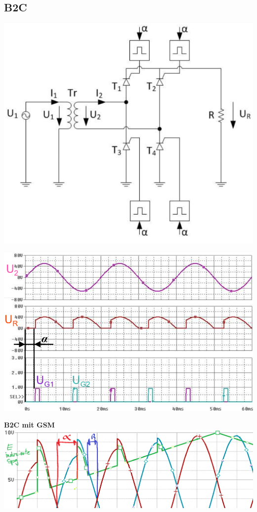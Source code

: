 \subsection{B2C}
\begin{minipage}{0.3\linewidth}
    \includegraphics[width=\linewidth]{images/GRB2c}
\end{minipage}
\begin{minipage}{0.25\linewidth}
    \includegraphics[width=\linewidth]{images/B2CKl}  
\end{minipage}
\begin{minipage}{0.4\linewidth}
    \textbf{B2C mit GSM}\newline
   \includegraphics[width=\linewidth]{images/B2CGSM} 
\end{minipage}
\newline
\vspace{-0.8cm}

